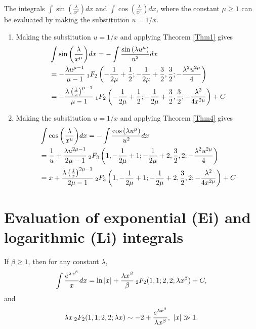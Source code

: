 \documentclass[smallextended]{svjour3}
\begin{document}
The integrals $\int\sin{\left(\frac{\lambda} {x^\mu}\right)}dx$ and $\int\cos{\left(\frac{\lambda} {x^\mu}\right)}dx$, where the constant $\mu\ge1$ can be evaluated by making the substitution $u=1/x$.
\begin{example}
\begin{enumerate}
\item Making the substitution $u=1/x$ and applying Theorem \ref{Thm1} gives
\begin{align}
&\int\sin{\left(\frac{\lambda} {x^\mu}\right)}dx=-\int\frac{\sin{\left(\lambda u^\mu\right)}}{u^2}dx
\nonumber\\ &=-\frac{\lambda u^{\mu-1}}{\mu-1}\hspace{.075cm} _{1}F_{2}\left(-\frac{1}{2\mu}+\frac{1}{2};-\frac{1}{2\mu}+\frac{3}{2},\frac{3}{2};-\frac{\lambda^2 u^{2\mu}}{4}\right)
\nonumber\\ &=-\frac{\lambda\left(\frac{1}{x}\right)^{\mu-1}}{\mu-1}\hspace{.075cm} _{1}F_{2}\left(-\frac{1}{2\mu}+\frac{1}{2};-\frac{1}{2\mu}+\frac{3}{2},\frac{3}{2};-\frac{\lambda^2 }{4 x^{2\mu}}\right)+C
\end{align}
\item Making the substitution $u=1/x$ and applying Theorem \ref{Thm4} gives
\begin{align}
&\int\cos{\left(\frac{\lambda} {x^\mu}\right)}dx=-\int\frac{\cos{\left(\lambda u^\mu\right)}}{u^2}dx
\nonumber\\ &=\frac{1}{u}+\frac{\lambda u^{2\mu-1}}{2\mu-1}\hspace{.075cm} _{2}F_{3}\left(1,-\frac{1}{2\mu}+1;-\frac{1}{2\mu}+2,\frac{3}{2},2;-\frac{\lambda^2 u^{2\mu}}{4}\right)
\nonumber\\ &=x+\frac{\lambda\left(\frac{1}{x}\right)^{2\mu-1}}{2\mu-1}\hspace{.075cm} _{2}F_{3}\left(1,-\frac{1}{2\mu}+1;-\frac{1}{2\mu}+2,\frac{3}{2},2;-\frac{\lambda^2 }{4 x^{2\mu}}\right)+C
\end{align}
\end{enumerate}
\label{ex4}
\end{example}
\section{Evaluation of exponential (Ei) and logarithmic (Li) integrals}\label{log-integral}
\begin{proposition}
If $\beta\ge1$, then for any constant $\lambda$,
\begin{equation}
\int \frac{e^{\lambda x^\beta}}{x}dx=\ln{|x|}+\frac{\lambda x^\beta}{\beta}\hspace{.075cm}   _{2}F_{2}(1,1;2,2;\lambda x^\beta)+C,
\label{prp2-1}
\end{equation}
and
\begin{equation}
\lambda x\hspace{.075cm}   _{2}F_{2}(1,1;2,2;\lambda x)\sim-2+\frac{e^{\lambda x^\beta}}{\lambda x^\beta}, \hspace{.12cm} |x|\gg1.
\label{prp2-2}
\end{equation}
\label{prp2}
\end{proposition}
\end{document}
